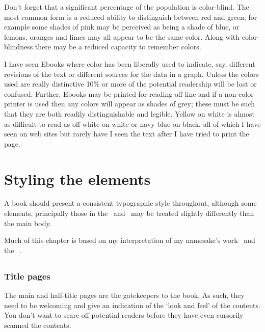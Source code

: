 \documentclass[10pt,letterpaper,extrafontsizes]{memoir}
\begin{document}
    Don't forget that a significant percentage of the population is 
color-blind. 
The most common form is a reduced ability to distinguish
between red and green; for example some shades of pink may be perceived
as being a shade of blue, or lemons, oranges and limes may all appear to
be the same color. Along with color-blindness there may be a reduced
capacity to remember colors.

    I have seen Ebooks where color has been liberally used to indicate, say, 
different revisions of the text or different sources for the data in a graph. 
Unless the colors used are really distinctive 10\% or more of the potential 
readership will be lost or confused. Further,
Ebooks may be printed for reading off-line and if a non-color printer is
used then any colors will appear as shades of grey; these must be such that
they are both readily distinguishable and legible. Yellow on white is almost
as difficult to read as off-white on white or navy blue on black, all of
which I have seen on web sites but rarely have I seen the text after I 
have tried to print the page.



\chapter{Styling the elements}

    A book should present a consistent typographic style throughout, although
some elements, principally those in the \pixfrontmatter\ and \pixbackmatter\ 
may be treated slightly differently than the main body. 

    Much of this chapter is based on my interpretation of my namesake's 
work~\autocite{ADRIANWILSON93} and the \btitle{Chicago Manual of Style}~\autocite{CMS}.

\section{\prFrontmatter}

\subsection{Title pages}

    The main and half-title pages are the gatekeepers to the book. As such,
they need to be welcoming and give an indication of the `look and feel'
of the contents. You don't want to scare off potential readers before they
have even cursorily scanned the contents.
\end{document}
